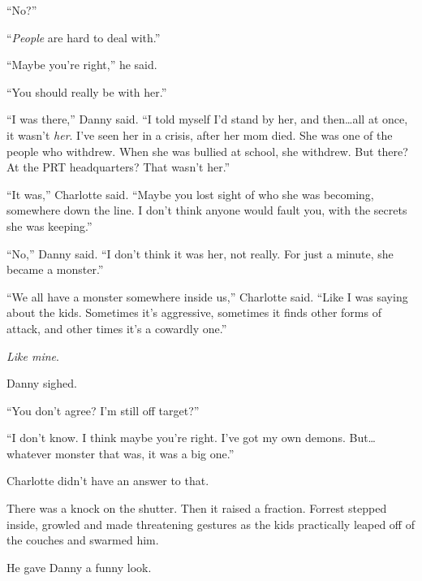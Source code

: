 ``No?''



``\emph{People} are hard to deal with.''



``Maybe you're right,'' he said.



``You should really be with her.''



``I was there,'' Danny said.  ``I told myself I'd stand by her, and then\ldots all at once, it wasn't \emph{her}.  I've seen her in a crisis, after her mom died.  She was one of the people who withdrew.  When she was bullied at school, she withdrew.  But there?  At the PRT headquarters?  That wasn't her.''



``It was,'' Charlotte said.  ``Maybe you lost sight of who she was becoming, somewhere down the line.  I don't think anyone would fault you, with the secrets she was keeping.''



``No,'' Danny said.  ``I don't think it was her, not really.  For just a minute, she became a monster.''



``We all have a monster somewhere inside us,'' Charlotte said.  ``Like I was saying about the kids.  Sometimes it's aggressive, sometimes it finds other forms of attack, and other times it's a cowardly one.''



\emph{Like mine}.



Danny sighed.



``You don't agree?  I'm still off target?''



``I don't know.  I think maybe you're right.  I've got my own demons.  But\ldots whatever monster that was, it was a big one.''



Charlotte didn't have an answer to that.



There was a knock on the shutter.  Then it raised a fraction.  Forrest stepped inside, growled and made threatening gestures as the kids practically leaped off of the couches and swarmed him.



He gave Danny a funny look.




